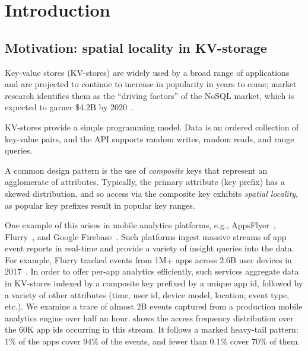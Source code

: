 \documentclass[sigplan,10pt]{acmart}
\providecommand{\DIFadd}[1]{{\protect\color{blue}\uwave{#1}}} %
\providecommand{\DIFaddbegin}{} %
\providecommand{\DIFaddend}{} %
\begin{document}
\maketitle

\section{Introduction}
\label{sec:intro}
\subsection{Motivation:  spatial locality in KV-storage}

Key-value stores (KV-stores) are widely used  by a broad range of applications and are projected
to continue to increase in popularity in years to come; market research  identifies them as the 
``driving factors'' of the NoSQL market, which is expected to garner \$4.2B by 2020~\cite{alliedmarketresearch}.

KV-stores provide a simple programming model. 
Data is an ordered collection of key-value pairs, and the API supports random writes, 
random reads, and range queries. 

A common design pattern is the use of \emph{composite} keys that represent an agglomerate of attributes.
Typically, the primary attribute (key prefix) %
has a skewed distribution, and so   access via the composite key exhibits \emph{spatial locality}, as 
popular key prefixes result in popular key ranges\DIFaddbegin \DIFadd{~\mbox{%
\cite{facebook-workloads}}\hspace{0pt}%
}\DIFaddend . 

One example of this arises in mobile analytics platforms, e.g., AppsFlyer~\cite{appsflyer}, Flurry~\cite{flurry}, 
and Google Firebase~\cite{firebase}. %
Such platforms %
ingest massive streams of app event reports %
in  real-time and provide a variety of insight queries into the data. For example, Flurry tracked events from  
1M+ apps across 2.6B user devices  in 2017~\cite{FlurryReport2017}. In order to offer per-app analytics efficiently,
such services aggregate data in KV-stores indexed by a composite key prefixed by a unique app 
id,  followed by a variety of other attributes (time, user id, device model, location, event type, etc.).
%
We examine a trace of almost $2$B  events captured from a production mobile analytics engine 
over half an hour.  
 shows the access frequency distribution over the  $60$K app ids occurring in this stream. It follows a marked
heavy-tail pattern: 
$1$\% of the apps  cover $94$\% of the events, and fewer 
than $0.1$\% cover $70$\% of them. 
\end{document}
